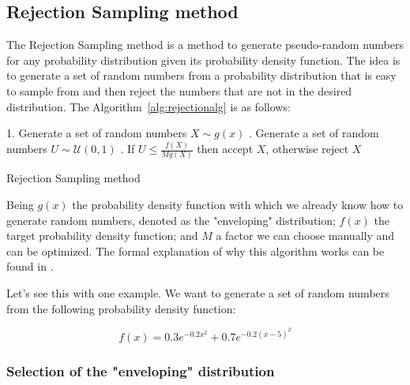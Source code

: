 \documentclass{article}
\begin{document}
\subsection{Rejection Sampling method}
\label{sec:rejection_sampling}

The Rejection Sampling method is a method to generate pseudo-random numbers for any probability distribution given its probability density function. The idea is to generate a set of random numbers from a probability distribution that is easy to sample from and then reject the numbers that are not in the desired distribution. The Algorithm~\ref{alg:rejectionalg} is as follows:

\begin{center}
	\begin{minipage}{0.7\linewidth} %
		\begin{algorithm}[H]
			1. Generate a set of random numbers \(X \sim g(x)\) . Generate a set of random numbers \(U \sim \mathcal{U}(0,1)\) . If \(U \leq \frac{f(X)}{Mg(X)}\) then accept \(X\), otherwise reject \(X\) \;
			\caption{Rejection Sampling method} %
			\label{alg:rejectionalg}   %
		\end{algorithm}
	\end{minipage}
\end{center}

Being \(g(x)\) the probability density function with which we already know how to generate random numbers, denoted as the "enveloping" distribution; \(f(x)\) the target probability density function; and \(M\) a factor we can choose manually and can be optimized. The formal explanation of why this algorithm works can be found in \cite{peng2023rejectionsampling}.

Let's see this with one example. We want to generate a set of random numbers from the following probability density function: 

\begin{equation} \label{eq:bimodal} f(x) = 0.3e^{-0.2x^2}+0.7e^{-0.2(x-5)^2} \end{equation}

\subsubsection{Selection of the "enveloping" distribution}
\label{sec:enveloping_distribution}
\end{document}
